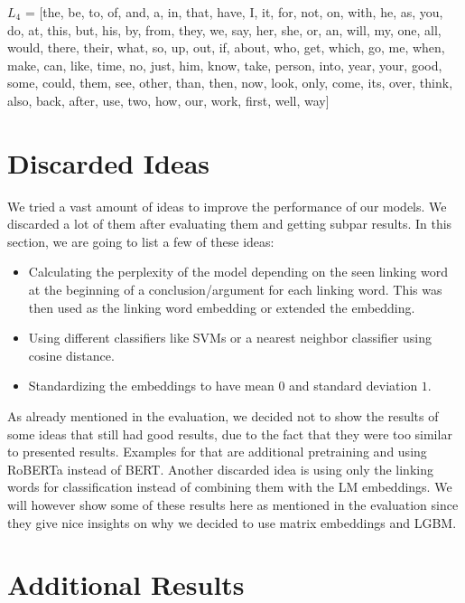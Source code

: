 $L_4$ = [the,
        be,
        to,
        of,
        and,
        a,
        in,
        that,
        have,
        I,
        it,
        for,
        not,
        on,
        with,
        he,
        as,
        you,
        do,
        at,
        this,
        but,
        his,
        by,
        from,
        they,
        we,
        say,
        her,
        she,
        or,
        an,
        will,
        my,
        one,
        all,
        would,
        there,
        their,
        what,
        so,
        up,
        out,
        if,
        about,
        who,
        get,
        which,
        go,
        me,
        when,
        make,
        can,
        like,
        time,
        no,
        just,
        him,
        know,
        take,
        person,
        into,
        year,
        your,
        good,
        some,
        could,
        them,
        see,
        other,
        than,
        then,
        now,
        look,
        only,
        come,
        its,
        over,
        think,
        also,
        back,
        after,
        use,
        two,
        how,
        our,
        work,
        first,
        well,
        way]

\section{Discarded Ideas}
We tried a vast amount of ideas to improve the performance of our models. We discarded a lot of them after evaluating them and getting subpar results. In this section, we are going to list a few of these ideas:

\begin{itemize}
	\item Calculating the perplexity of the model depending on the seen linking word at the beginning of a conclusion/argument 			  for each linking word. This was then used as the linking word embedding or extended the embedding.
	\item Using different classifiers like SVMs or a nearest neighbor classifier using cosine distance.
	\item Standardizing the embeddings to have mean $0$ and standard deviation $1$.
\end{itemize} 

As already mentioned in the evaluation, we decided not to show the results of some ideas that still had good results, due to the fact that they were too similar to presented results. Examples for that are additional pretraining and using RoBERTa instead of BERT. Another discarded idea is using only the linking words for classification instead of combining them with the LM embeddings. We will however show some of these results here as mentioned in the evaluation since they give nice insights on why we decided to use matrix embeddings and LGBM.

\section{Additional Results}